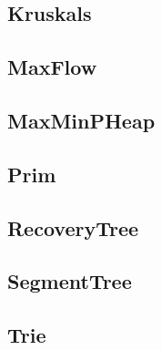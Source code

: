 \subsection{ Kruskals}
\raggedbottom
\hrulefill
\subsection{ MaxFlow}
\raggedbottom
\hrulefill
\subsection{ MaxMinPHeap}
\raggedbottom
\hrulefill
\subsection{ Prim}
\raggedbottom
\hrulefill
\subsection{ RecoveryTree}
\raggedbottom
\hrulefill
\subsection{ SegmentTree}
\raggedbottom
\hrulefill
\subsection{ Trie}
\raggedbottom
\hrulefill

